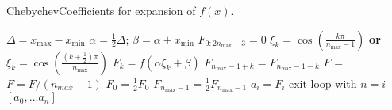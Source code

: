 \begin{algorithm}
  \caption{{\sc ChebychevCoefficients}
  for expansion of $f(x)$.
  \label{al:ChebyCoeffs}
  }
  \begin{algorithmic}[1]
    \Statex
    \Statex
     \State $\Delta = x_{\max} - x_{\min}$
     \State $\alpha = \frac{1}{2} \Delta$;
            $\beta = \alpha + x_{\min}$
     \State $F_{0:2 n_{\max}-3} = 0$
        \State $\xi_{k} = \cos\left( \frac{k \pi}{n_{\max} - 1} \right)$
               {\bf or}
               $\xi_{k} = \cos\left( \frac{\left(k + \frac{1}{2} \right) \pi}
                                        {n_{\max}}
                          \right)$
        \State $F_k = f(\alpha \xi_{k} + \beta)$
     \EndFor
      
        \State $F_{n_{\max}-1+k} = F_{n_{\max}-1-k}$
     \EndFor
     \State $F$ = 
     \State $F = F / (n_{max}-1)$
     \State $F_0 = \frac{1}{2} F_0$
     \State $F_{n_{\max}-1} = \frac{1}{2} F_{n_{\max}-1}$
       \State $a_i = F_i$
        exit loop with $n=i$
     \EndFor
     \State \Return $[a_0, \dots a_n]$
   \EndProcedure
  \end{algorithmic}
\end{algorithm}

